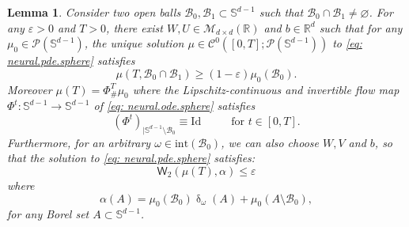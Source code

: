 \documentclass[a4paper,11pt]{article}
\theoremstyle{plain}
\newtheorem{lemma}[theorem]{Lemma}
\newcommand{\R}{\mathbb{R}}
\renewcommand{\S}{\mathbb{S}^{d-1}}
\newcommand{\bW}{\bm{\mathit{W}}}
\newcommand{\bV}{\bm{\mathit{V}}}
\newcommand{\bU}{\bm{\mathit{U}}}
\renewcommand{\leq}{\leqslant}
\renewcommand{\geq}{\geqslant}
\numberwithin{equation}{section}
\begin{document}
\begin{lemma} \label{lem: two.balls}
    Consider two open balls $\mathscr{B}_0,\mathscr{B}_1\subset \S$ such that $\mathscr{B}_0\cap\mathscr{B}_1\neq\varnothing$.
    For any $\varepsilon>0$ and $T>0$, there exist $\bW,\bU\in\mathscr{M}_{d\times d}(\R)$ and $b\in\mathbb{R}^d$ such that for any $\mu_0\in\mathscr{P}(\S)$, the unique solution $\mu\in \mathscr{C}^0([0, T];\mathscr{P}(\S))$ to \eqref{eq: neural.pde.sphere} satisfies
    \begin{equation} \label{eq: claim.statement.lemmaA1}
        \mu(T, \mathscr{B}_0\cap\mathscr{B}_1)\geq(1-\varepsilon)\mu_0(\mathscr{B}_0).
    \end{equation}
    Moreover $\mu(T)=\Phi^T_\#\mu_0$ where the Lipschitz-continuous and invertible flow map $\Phi^t:\S\to\S$ of \eqref{eq: neural.ode.sphere} satisfies 
    \begin{equation*}
    (\Phi^t)_{\mid\S\setminus \mathscr{B}_0}\equiv\mathrm{Id} \hspace{1cm} \text{ for } t\in[0,T].    
    \end{equation*}
    Furthermore, for an arbitrary $\omega\in \mathrm{int}(\mathscr{B}_0)$, we can also choose $\bW,\bV$ and $b$, so that the solution to \eqref{eq: neural.pde.sphere} satisfies:
    \begin{equation*}
        \mathsf{W}_2(\mu(T),\alpha)\leq \varepsilon
    \end{equation*}
    where
    \begin{equation*}
        \alpha(A)=\mu_0(\mathscr{B}_0)\updelta_{\omega}(A)+\mu_0(A\setminus\mathscr{B}_0),
    \end{equation*}
    for any Borel set $A\subset \S$.
\end{lemma}
    
\end{document}
